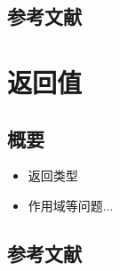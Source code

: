 \documentclass[UTF8,a4paper,12pt]{ctexart}
\begin{document}
	\subsection{参考文献}
\section{返回值}
	\subsection{概要}
	\begin{itemize}
		\item  返回类型
		\item  作用域等问题...
	\end{itemize}
	\subsection{参考文献}	    
\end{document}
